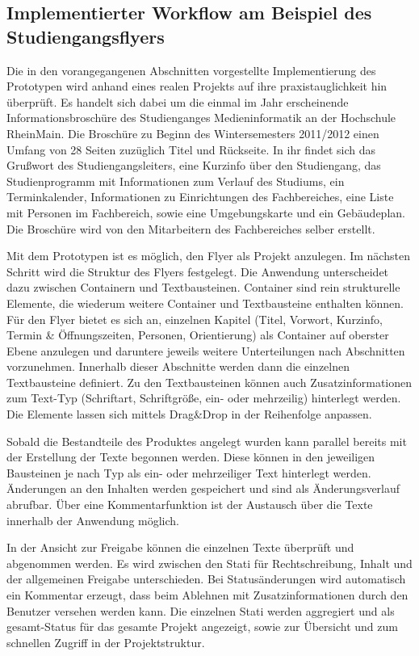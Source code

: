 \subsection{Implementierter Workflow am Beispiel des Studiengangsflyers}

Die in den vorangegangenen Abschnitten vorgestellte Implementierung des Prototypen wird anhand eines realen Projekts auf ihre praxistauglichkeit hin überprüft. Es handelt sich dabei um die einmal im Jahr erscheinende Informationsbroschüre des Studienganges Medieninformatik an der Hochschule RheinMain. Die Broschüre zu Beginn des Wintersemesters 2011/2012 einen Umfang von 28 Seiten zuzüglich Titel und Rückseite. In ihr findet sich das Grußwort des Studiengangsleiters, eine Kurzinfo über den Studiengang, das Studienprogramm mit Informationen zum Verlauf des Studiums, ein Terminkalender, Informationen zu Einrichtungen des Fachbereiches, eine Liste mit Personen im Fachbereich, sowie eine Umgebungskarte und ein Gebäudeplan. Die Broschüre wird von den Mitarbeitern des Fachbereiches selber erstellt.

\bigskip

Mit dem Prototypen ist es möglich, den Flyer als Projekt anzulegen. Im nächsten Schritt wird die Struktur des Flyers festgelegt. Die Anwendung unterscheidet dazu zwischen Containern und Textbausteinen. Container sind rein strukturelle Elemente, die wiederum weitere Container und Textbausteine enthalten können. Für den Flyer bietet es sich an, einzelnen Kapitel (Titel, Vorwort, Kurzinfo, Termin \& Öffnungszeiten, Personen, Orientierung) als Container auf oberster Ebene anzulegen und daruntere jeweils weitere Unterteilungen nach Abschnitten vorzunehmen. Innerhalb dieser Abschnitte werden dann die einzelnen Textbausteine definiert. Zu den Textbausteinen können auch Zusatzinformationen zum Text-Typ (Schriftart, Schriftgröße, ein- oder mehrzeilig) hinterlegt werden. Die Elemente lassen sich mittels Drag\&Drop in der Reihenfolge anpassen.

Sobald die Bestandteile des Produktes angelegt wurden kann parallel bereits mit der Erstellung der Texte begonnen werden. Diese können in den jeweiligen Bausteinen je nach Typ als ein- oder mehrzeiliger Text hinterlegt werden. Änderungen an den Inhalten werden gespeichert und sind als Änderungsverlauf abrufbar. Über eine Kommentarfunktion ist der Austausch über die Texte innerhalb der Anwendung möglich. 

In der Ansicht zur Freigabe können die einzelnen Texte überprüft und abgenommen werden. Es wird zwischen den Stati für Rechtschreibung, Inhalt und der allgemeinen Freigabe unterschieden. Bei Statusänderungen wird automatisch ein Kommentar erzeugt, dass beim Ablehnen mit Zusatzinformationen durch den Benutzer versehen werden kann. Die einzelnen Stati werden aggregiert und als gesamt-Status für das gesamte Projekt angezeigt, sowie zur Übersicht und zum schnellen Zugriff in der Projektstruktur.

